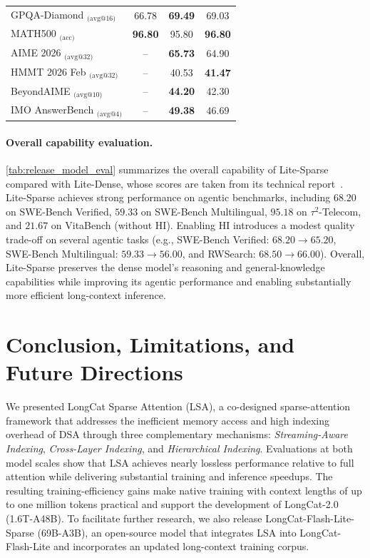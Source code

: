 \documentclass{article}
\begin{document}
\begin{table}[htbp]
\begin{tabular}{l|c|cc}
GPQA-Diamond $_{\text{(avg@16)}}$ & 66.78 & \textbf{69.49} & 69.03 \\
MATH500 $_{\text{(acc)}}$       & \textbf{96.80} & 95.80 & \textbf{96.80} \\
AIME 2026 $_{\text{(avg@32)}}$  & -- & \textbf{65.73} & 64.90 \\
HMMT 2026 Feb $_{\text{(avg@32)}}$ & -- & 40.53 & \textbf{41.47} \\
BeyondAIME $_{\text{(avg@10)}}$ & -- & \textbf{44.20} & 42.30 \\
IMO AnswerBench $_{\text{(avg@4)}}$ & -- & \textbf{49.38} & 46.69 \\
\bottomrule
\end{tabular}
\end{table}


\paragraph{Overall capability evaluation.}
\cref{tab:release_model_eval} summarizes the overall capability of Lite-Sparse compared with Lite-Dense, whose scores are taken from its technical report~\citep{liu2026scaling}.
Lite-Sparse achieves strong performance on agentic benchmarks, including \(68.20\) on SWE-Bench Verified, \(59.33\) on SWE-Bench Multilingual, \(95.18\) on \(\tau^2\)-Telecom, and \(21.67\) on VitaBench (without HI). Enabling HI introduces a modest quality trade-off on several agentic tasks (e.g., SWE-Bench Verified: \(68.20\rightarrow65.20\), SWE-Bench Multilingual: \(59.33\rightarrow56.00\), and RWSearch: \(68.50\rightarrow66.00\)). Overall, Lite-Sparse preserves the dense model's reasoning and general-knowledge capabilities while improving its agentic performance and enabling substantially more efficient long-context inference.

\section{Conclusion, Limitations, and Future Directions}
We presented LongCat Sparse Attention (LSA), a co-designed sparse-attention framework that addresses the inefficient memory access and high indexing overhead of DSA through three complementary mechanisms: \emph{Streaming-Aware Indexing}, \emph{Cross-Layer Indexing}, and \emph{Hierarchical Indexing}. Evaluations at both model scales show that LSA achieves nearly lossless performance relative to full attention while delivering substantial training and inference speedups. The resulting training-efficiency gains make native training with context lengths of up to one million tokens practical and support the development of LongCat-2.0 (1.6T-A48B). To facilitate further research, we also release LongCat-Flash-Lite-Sparse (69B-A3B), an open-source model that integrates LSA into LongCat-Flash-Lite and incorporates an updated long-context training corpus.
\end{document}
